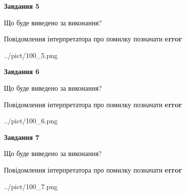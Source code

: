 \documentclass[10pt, ukrainian]{article}
\begin{document}
{\begin {large}
{\begin {center}\textbf{Завдання 5}\end {center}}\par
Що буде виведено за виконання? \par
Повідомлення інтерпретатора про помилку позначати \textbf{error}

\begin{center}
	{../pict/100_5.png}
\end{center}
\newpage

{\begin {center}\textbf{Завдання 6}\end {center}}\par
Що буде виведено за виконання? \par
Повідомлення інтерпретатора про помилку позначати \textbf{error}

\begin{center}
	{../pict/100_6.png}
\end{center}
\newpage

{\begin {center}\textbf{Завдання 7}\end {center}}\par
Що буде виведено за виконання? \par
Повідомлення інтерпретатора про помилку позначати \textbf{error}

\begin{center}
	{../pict/100_7.png}
\end{center}
\newpage

\end {large}}
\end{document}
